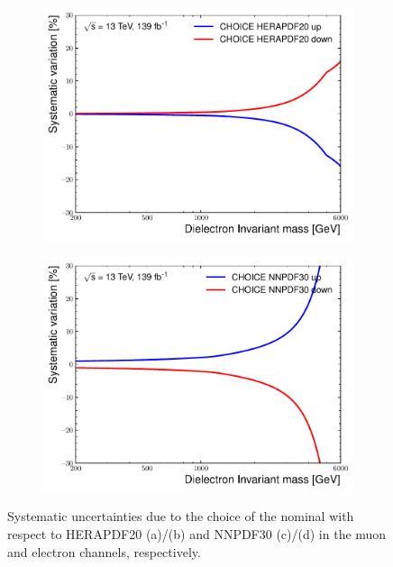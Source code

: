 \begin{figure}[h!]
    \begin{subfigure}[b]{0.42\textwidth}
        \centering
        \includegraphics[width=\textwidth]{figures/analysis/datamc/Uncertainties/theory/ee/backgroundTemplate_KF_CHOICE_HERAPDF20.pdf}
        \caption{}
        \label{fig:uncert:eechoiceHERA}
    \end{subfigure}
    \begin{subfigure}[b]{0.42\textwidth}
        \centering
        \includegraphics[width=\textwidth]{figures/analysis/datamc/Uncertainties/theory/ee/backgroundTemplate_KF_CHOICE_NNPDF30.pdf}
        \caption{}
        \label{fig:uncert:eechoiceNNPDF}
    \end{subfigure}
    \caption{Systematic uncertainties due to the choice of the nominal with respect to HERAPDF20 (a)/(b) and NNPDF30 (c)/(d) in the muon and electron channels, respectively.}
    \label{fig:uncert:pdfchoice}
\end{figure}

